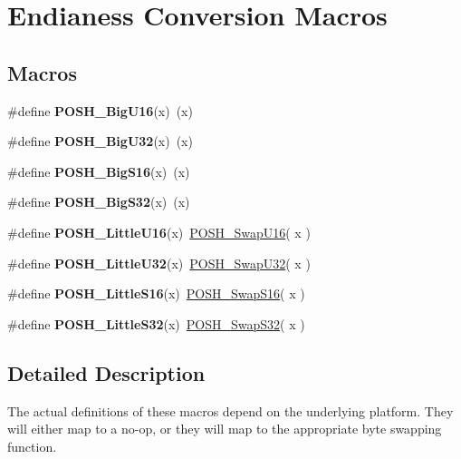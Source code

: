 \hypertarget{group__ByteSwapMacros}{}\section{Endianess Conversion Macros}
\label{group__ByteSwapMacros}
\subsection*{Macros}
\begin{DoxyCompactItemize}
\item 
\#define {\bfseries P\+O\+S\+H\+\_\+\+Big\+U16}(x)~(x)\hypertarget{group__ByteSwapMacros_ga8fe6962c20f07c920073a7bc228b454a}{}\label{group__ByteSwapMacros_ga8fe6962c20f07c920073a7bc228b454a}

\item 
\#define {\bfseries P\+O\+S\+H\+\_\+\+Big\+U32}(x)~(x)\hypertarget{group__ByteSwapMacros_gacecb3c053be442cebd4f9947183537cc}{}\label{group__ByteSwapMacros_gacecb3c053be442cebd4f9947183537cc}

\item 
\#define {\bfseries P\+O\+S\+H\+\_\+\+Big\+S16}(x)~(x)\hypertarget{group__ByteSwapMacros_ga49c7bc8ecf38b60e09118f6cf5a45f5a}{}\label{group__ByteSwapMacros_ga49c7bc8ecf38b60e09118f6cf5a45f5a}

\item 
\#define {\bfseries P\+O\+S\+H\+\_\+\+Big\+S32}(x)~(x)\hypertarget{group__ByteSwapMacros_ga1cfaafaa2b0a92b7987eb257cf0bfa36}{}\label{group__ByteSwapMacros_ga1cfaafaa2b0a92b7987eb257cf0bfa36}

\item 
\#define {\bfseries P\+O\+S\+H\+\_\+\+Little\+U16}(x)~\hyperlink{group__ByteSwapFunctions_ga401e0af0e8d08dba16164b5c8c9b3afd}{P\+O\+S\+H\+\_\+\+Swap\+U16}( x )\hypertarget{group__ByteSwapMacros_ga11c748ee5e06d0b69f78e065f2f7d943}{}\label{group__ByteSwapMacros_ga11c748ee5e06d0b69f78e065f2f7d943}

\item 
\#define {\bfseries P\+O\+S\+H\+\_\+\+Little\+U32}(x)~\hyperlink{group__ByteSwapFunctions_ga97f53ca21ec6feab173b13693f714b27}{P\+O\+S\+H\+\_\+\+Swap\+U32}( x )\hypertarget{group__ByteSwapMacros_gaa20638280e56bfbc7c4b89b816498e56}{}\label{group__ByteSwapMacros_gaa20638280e56bfbc7c4b89b816498e56}

\item 
\#define {\bfseries P\+O\+S\+H\+\_\+\+Little\+S16}(x)~\hyperlink{group__ByteSwapFunctions_ga0b4aa282339ed3629dd4517deb777387}{P\+O\+S\+H\+\_\+\+Swap\+S16}( x )\hypertarget{group__ByteSwapMacros_gabf6d5fbd6c442eeae138737d5bd67ee9}{}\label{group__ByteSwapMacros_gabf6d5fbd6c442eeae138737d5bd67ee9}

\item 
\#define {\bfseries P\+O\+S\+H\+\_\+\+Little\+S32}(x)~\hyperlink{group__ByteSwapFunctions_ga489b591bc4db4d2682be5f69cc5acb24}{P\+O\+S\+H\+\_\+\+Swap\+S32}( x )\hypertarget{group__ByteSwapMacros_gaf7bf5570a1a65707305892a859a1c30a}{}\label{group__ByteSwapMacros_gaf7bf5570a1a65707305892a859a1c30a}

\end{DoxyCompactItemize}


\subsection{Detailed Description}
The actual definitions of these macros depend on the underlying platform. They will either map to a no-\/op, or they will map to the appropriate byte swapping function. 